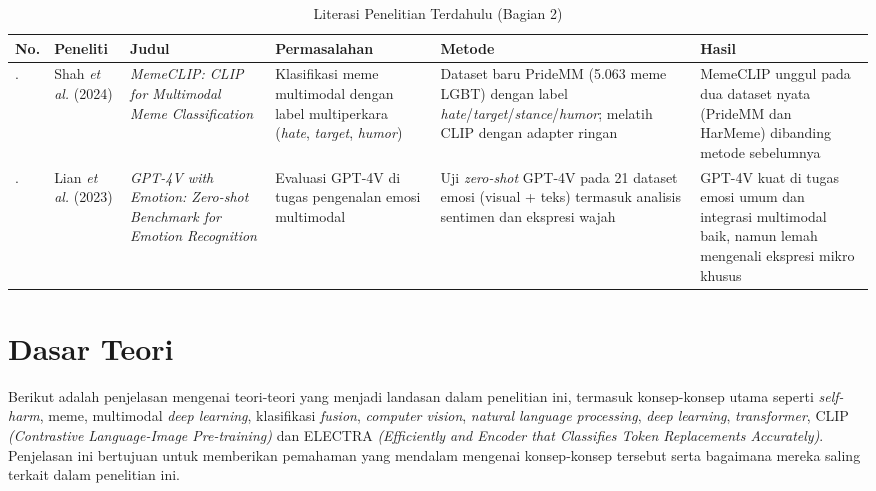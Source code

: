 \begin{landscape}
\begin{table}[H]
    \centering
    \caption{Literasi Penelitian Terdahulu (Bagian 2)}
    \label{table:2.literasi.2}
    \small
    \setlength{\tabcolsep}{4pt}
    \renewcommand{\arraystretch}{1.2}
    \begin{tabular}{>{\raggedright\arraybackslash}m{0.4cm} >{\raggedright\arraybackslash}m{1.6cm} >{\raggedright\arraybackslash}m{3cm} >{\raggedright\arraybackslash}m{2.8cm} >{\raggedright\arraybackslash}m{3cm} >{\raggedright\arraybackslash}m{3.8cm}}
        \hline
        \textbf{No.} & \textbf{Peneliti} & \textbf{Judul} & \textbf{Permasalahan} & \textbf{Metode} & \textbf{Hasil} \\
        \hline
        4. & Shah \textit{et al.} (2024) \cite{shah2024memeclip} & \textit{MemeCLIP: CLIP for Multimodal Meme Classification} & Klasifikasi meme multimodal dengan label multiperkara (\textit{hate}, \textit{target}, \textit{humor}) & Dataset baru PrideMM (5.063 meme LGBT) dengan label \textit{hate}/\textit{target}/\textit{stance}/\textit{humor}; melatih CLIP dengan adapter ringan & MemeCLIP unggul pada dua dataset nyata (PrideMM dan HarMeme) dibanding metode sebelumnya \\
        \hline
        5. & Lian \textit{et al.} (2023) \cite{lian2023gpt4v} & \textit{GPT-4V with Emotion: Zero-shot Benchmark for Emotion Recognition} & Evaluasi GPT-4V di tugas pengenalan emosi multimodal & Uji \textit{zero-shot} GPT-4V pada 21 dataset emosi (visual + teks) termasuk analisis sentimen dan ekspresi wajah & GPT-4V kuat di tugas emosi umum dan integrasi multimodal baik, namun lemah mengenali ekspresi mikro khusus \\
        \hline
    \end{tabular}
\end{table}
\end{landscape}




\section{Dasar Teori} \label{II.teori}
Berikut adalah penjelasan mengenai teori-teori yang menjadi landasan dalam penelitian ini, termasuk konsep-konsep utama seperti \textit{self-harm}, meme, multimodal \textit{deep learning}, klasifikasi \textit{fusion}, \textit{computer vision}, \textit{natural language processing}, \textit{deep learning}, \textit{transformer}, CLIP \textit{(Contrastive Language-Image Pre-training)} dan ELECTRA \textit{(Efficiently and Encoder that Classifies Token Replacements Accurately)}. Penjelasan ini bertujuan untuk memberikan pemahaman yang mendalam mengenai konsep-konsep tersebut serta bagaimana mereka saling terkait dalam penelitian ini.

